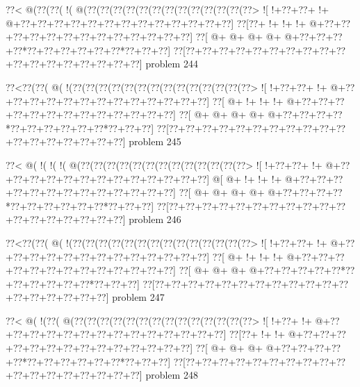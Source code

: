 \vbox{\vbox{\goo
\0??<\- @(\0??(\0??(\- !(\- @(\0??(\0??(\0??(\0??(\0??(\0??(\0??(\0??(\0??(\0??(\0??(\0??(\0??>
\- ![\- !+\0??+\0??+\- !+\- @+\0??+\0??+\0??+\0??+\0??+\0??+\0??+\0??+\0??+\0??+\0??+\0??+\0??]
\0??[\0??+\- !+\- !+\- !+\- @+\0??+\0??+\0??+\0??+\0??+\0??+\0??+\0??+\0??+\0??+\0??+\0??+\0??]
\0??[\- @+\- @+\- @+\- @+\- @+\0??+\0??+\0??+\0??*\0??+\0??+\0??+\0??+\0??+\0??*\0??+\0??+\0??]
\0??[\0??+\0??+\0??+\0??+\0??+\0??+\0??+\0??+\0??+\0??+\0??+\0??+\0??+\0??+\0??+\0??+\0??+\0??]
}
\hfil problem 244\hfil\break
}



\vbox{\vbox{\goo
\0??<\0??(\0??(\- @(\- !(\0??(\0??(\0??(\0??(\0??(\0??(\0??(\0??(\0??(\0??(\0??(\0??(\0??(\0??>
\- ![\- !+\0??+\0??+\- !+\- @+\0??+\0??+\0??+\0??+\0??+\0??+\0??+\0??+\0??+\0??+\0??+\0??+\0??]
\0??[\- @+\- !+\- !+\- !+\- @+\0??+\0??+\0??+\0??+\0??+\0??+\0??+\0??+\0??+\0??+\0??+\0??+\0??]
\0??[\- @+\- @+\- @+\- @+\- @+\0??+\0??+\0??+\0??*\0??+\0??+\0??+\0??+\0??+\0??*\0??+\0??+\0??]
\0??[\0??+\0??+\0??+\0??+\0??+\0??+\0??+\0??+\0??+\0??+\0??+\0??+\0??+\0??+\0??+\0??+\0??+\0??]
}
\hfil problem 245\hfil\break
}



\vbox{\vbox{\goo
\0??<\- @(\- !(\- !(\- !(\- @(\0??(\0??(\0??(\0??(\0??(\0??(\0??(\0??(\0??(\0??(\0??(\0??(\0??>
\- ![\- !+\0??+\0??+\- !+\- @+\0??+\0??+\0??+\0??+\0??+\0??+\0??+\0??+\0??+\0??+\0??+\0??+\0??]
\- @[\- @+\- !+\- !+\- !+\- @+\0??+\0??+\0??+\0??+\0??+\0??+\0??+\0??+\0??+\0??+\0??+\0??+\0??]
\0??[\- @+\- @+\- @+\- @+\- @+\0??+\0??+\0??+\0??*\0??+\0??+\0??+\0??+\0??+\0??*\0??+\0??+\0??]
\0??[\0??+\0??+\0??+\0??+\0??+\0??+\0??+\0??+\0??+\0??+\0??+\0??+\0??+\0??+\0??+\0??+\0??+\0??]
}
\hfil problem 246\hfil\break
}



\vbox{\vbox{\goo
\0??<\0??(\0??(\- @(\- !(\0??(\0??(\0??(\0??(\0??(\0??(\0??(\0??(\0??(\0??(\0??(\0??(\0??(\0??>
\- ![\- !+\0??+\0??+\- !+\- @+\0??+\0??+\0??+\0??+\0??+\0??+\0??+\0??+\0??+\0??+\0??+\0??+\0??]
\0??[\- @+\- !+\- !+\- !+\- @+\0??+\0??+\0??+\0??+\0??+\0??+\0??+\0??+\0??+\0??+\0??+\0??+\0??]
\0??[\- @+\- @+\- @+\- @+\0??+\0??+\0??+\0??+\0??*\0??+\0??+\0??+\0??+\0??+\0??*\0??+\0??+\0??]
\0??[\0??+\0??+\0??+\0??+\0??+\0??+\0??+\0??+\0??+\0??+\0??+\0??+\0??+\0??+\0??+\0??+\0??+\0??]
}
\hfil problem 247\hfil\break
}



\vbox{\vbox{\goo
\0??<\- @(\- !(\0??(\- @(\0??(\0??(\0??(\0??(\0??(\0??(\0??(\0??(\0??(\0??(\0??(\0??(\0??(\0??>
\- ![\- !+\0??+\- !+\- @+\0??+\0??+\0??+\0??+\0??+\0??+\0??+\0??+\0??+\0??+\0??+\0??+\0??+\0??]
\0??[\0??+\- !+\- !+\- @+\0??+\0??+\0??+\0??+\0??+\0??+\0??+\0??+\0??+\0??+\0??+\0??+\0??+\0??]
\0??[\- @+\- @+\- @+\- @+\0??+\0??+\0??+\0??+\0??*\0??+\0??+\0??+\0??+\0??+\0??*\0??+\0??+\0??]
\0??[\0??+\0??+\0??+\0??+\0??+\0??+\0??+\0??+\0??+\0??+\0??+\0??+\0??+\0??+\0??+\0??+\0??+\0??]
}
\hfil problem 248\hfil\break
}



